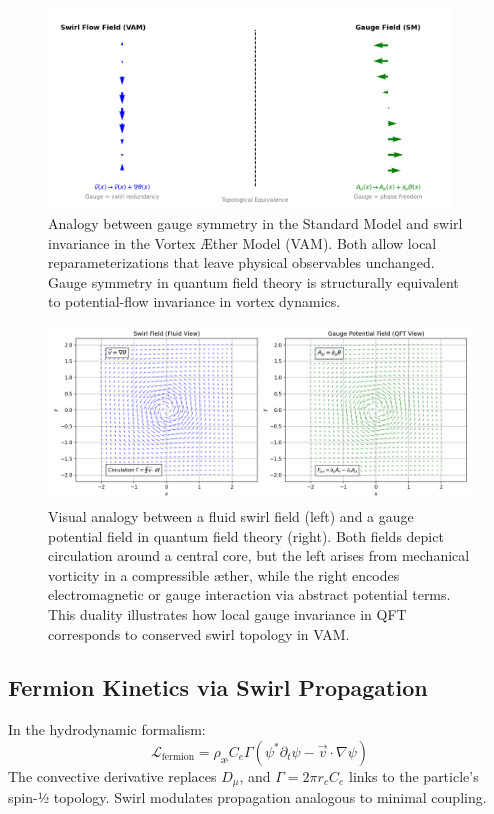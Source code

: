 \begin{figure}[H]
    \centering
    \includegraphics[width=0.95\textwidth]{images/gauge_swirl_equivalence}
    \caption{Analogy between gauge symmetry in the Standard Model and swirl invariance in the Vortex Æther Model (VAM). Both allow local reparameterizations that leave physical observables unchanged. Gauge symmetry in quantum field theory is structurally equivalent to potential-flow invariance in vortex dynamics.}
    \label{fig:gauge_swirl_equivalence}
\end{figure}

\begin{figure}[H]
    \centering
    \includegraphics[width=0.9\linewidth]{images/SwirlVSGauge}
    \caption{
        Visual analogy between a fluid swirl field (left) and a gauge potential field in quantum field theory (right).
        Both fields depict circulation around a central core, but the left arises from mechanical vorticity in a compressible æther,
        while the right encodes electromagnetic or gauge interaction via abstract potential terms.
        This duality illustrates how local gauge invariance in QFT corresponds to conserved swirl topology in VAM.
    }
    \label{fig:swirl_gauge_analogy}
\end{figure}

\subsection{Fermion Kinetics via Swirl Propagation}
In the hydrodynamic formalism:
\begin{equation}
    \mathcal{L}_{\text{fermion}} = \rho_\text{\ae} C_e \Gamma \left( \psi^* \partial_t \psi - \vec{v} \cdot \nabla \psi \right)
\end{equation}
The convective derivative replaces $D_\mu$, and $\Gamma = 2\pi r_c C_e$ links to the particle's spin-½ topology. Swirl modulates propagation analogous to minimal coupling.


